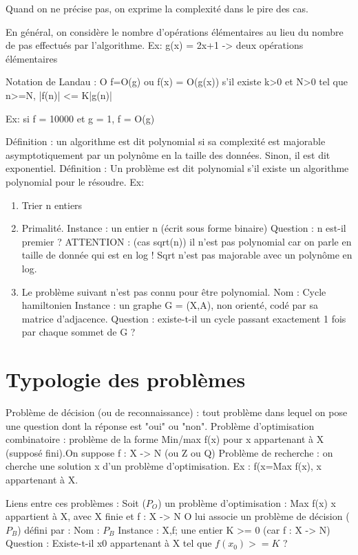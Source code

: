 \documentclass{article}
\begin{document}
    Quand on ne précise pas, on exprime la complexité dans le pire des cas.

    En général, on considère le nombre d'opérations élémentaires au lieu du nombre de pas effectués par l'algorithme.
    Ex: g(x) = 2x+1 -> deux opérations élémentaires

Notation de Landau : O
    f=O(g) ou f(x) = O(g(x))
    s'il existe k>0 et N>0 tel que
        n>=N, |f(n)| <= K|g(n)|

    Ex: si f = 10000 et g = 1, f = O(g)

Définition : un algorithme est dit polynomial si sa complexité est majorable asymptotiquement par un polynôme en la taille des données. Sinon, il est dit exponentiel.
Définition : Un problème est dit polynomial s'il existe un algorithme polynomial pour le résoudre.
Ex: \begin{enumerate}
    \item Trier n entiers
    \item Primalité. Instance : un entier n (écrit sous forme binaire)
        Question : n est-il premier ?
	ATTENTION : (cas sqrt(n)) il n'est pas polynomial car on parle en taille de donnée qui est en log ! Sqrt n'est pas majorable avec un polynôme en log.
    \item Le problème suivant n'est pas connu pour être polynomial.
        Nom : Cycle hamiltonien
	Instance : un graphe G = (X,A), non orienté, codé par sa matrice d'adjacence.
	Question : existe-t-il un cycle passant exactement 1 fois par chaque sommet de G ?
    \end{enumerate}

\section{Typologie des problèmes}
Problème de décision (ou de reconnaissance) : tout problème dans lequel on pose une question dont la réponse est "oui" ou "non".
Problème d'optimisation combinatoire : problème de la forme Min/max f(x) pour x appartenant à X (supposé fini).On suppose f : X -> N (ou Z ou Q)
Problème de recherche : on cherche une solution x\up{*} d'un problème d'optimisation. Ex : f(x\up{*}=Max f(x), x appartenant à X.

Liens entre ces problèmes :
    Soit ($P_O$) un problème d'optimisation :
        Max f(x) x appartient à X, avec X finie et f : X -> N
	O lui associe un problème de décision ($P_B$) défini par :
	    Nom : $P_B$
	    Instance : X,f; une entier K >= 0 (car f : X -> N)
	    Question : Existe-t-il x0 appartenant à X tel que $f(x_0) >= K$ ?
\end{document}
